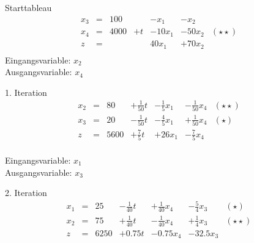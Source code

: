 \documentclass[a4paper]{scrartcl}
\begin{document}
\begin{enumerate}[label=\bfseries\arabic*.]
\begin{enumerate}
                Starttableau
                \begin{equation}
                    \begin{array}{rcrrrrc}
                        x_3 & = & 100 & & -x_1 & -x_2 \\
                        x_4 & = & 4000 & +t & -10x_1 & -50x_2 & (\star\star) \\
                        \hline
                        z & = & & & 40x_1 & +70x_2 \\
                    \end{array}
                \end{equation}
                Eingangsvariable: $x_2$ \\
                Ausgangsvariable: $x_4$

                1. Iteration
                \begin{equation}
                    \begin{array}{rcrrrrc}
                        x_2 & = & 80 & +\frac{1}{50}t & -\frac{1}{5}x_1 & -\frac{1}{50}x_4 & (\star\star) \\
                        x_3 & = & 20 & -\frac{1}{50}t & -\frac{4}{5}x_1 & +\frac{1}{50}x_4 & (\star) \\
                        \hline
                        z & = & 5600 & +\frac{7}{5}t & +26x_1 & -\frac{7}{5}x_4 \\
                    \end{array}
                \end{equation}

                Eingangsvariable: $x_1$ \\
                Ausgangsvariable: $x_3$

                2. Iteration
                \begin{equation}
                    \begin{array}{rcrrrrc}
                        x_1 & = & 25 & -\frac{1}{40}t & +\frac{1}{40}x_4 & -\frac{5}{4}x_3 & (\star) \\
                        x_2 & = & 75 & +\frac{1}{40}t & -\frac{1}{40}x_4 & +\frac{1}{4}x_3 & (\star\star) \\
                        \hline
                        z & = & 6250 & +0.75t & -0.75x_4 & -32.5x_3 \\
                    \end{array}
                \end{equation}


\end{enumerate}
\end{enumerate}
\end{document}
